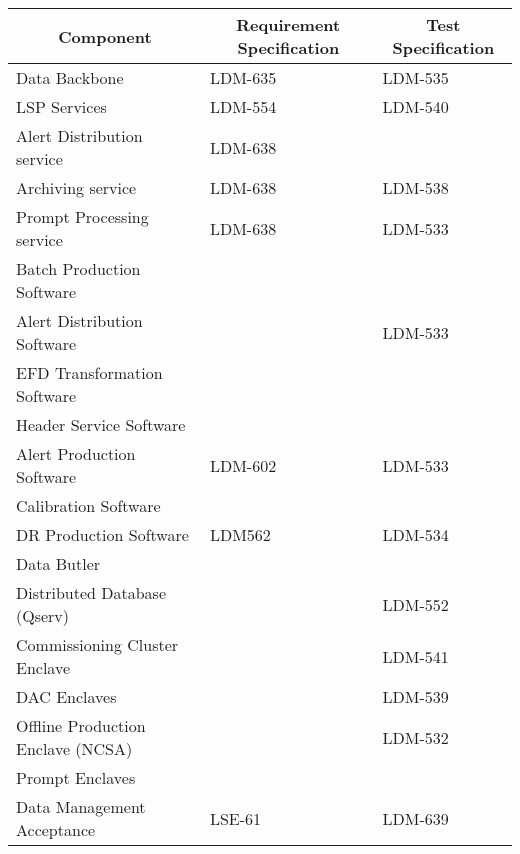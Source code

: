 \begin{longtable}{p{}|p{}|p{}}
\multicolumn{1}{c}{\textbf{Component}} & \multicolumn{1}{c}{\textbf{Requirement Specification}} &  \multicolumn{1}{c}{\textbf{Test Specification}} \\ \hline

Data Backbone                     & \cellcolor{dmorange} LDM-635 & \cellcolor{dmyellow} LDM-535 \\\hline
LSP Services                      &   \cellcolor{dmblue} LDM-554 &   \cellcolor{dmblue} LDM-540 \\\hline
Alert Distribution service        & \cellcolor{dmyellow} LDM-638 &                              \\\hline
Archiving service                 & \cellcolor{dmyellow} LDM-638 &   \cellcolor{dmblue} LDM-538 \\\hline
Prompt Processing service         & \cellcolor{dmyellow} LDM-638 &   \cellcolor{dmblue} LDM-533 \\\hline
Batch Production Software         &                              &                              \\\hline
Alert Distribution Software       &                              &   \cellcolor{dmblue} LDM-533 \\\hline
EFD Transformation Software       &                              &                              \\\hline
Header Service Software           &                              &                              \\\hline
Alert Production Software         &   \cellcolor{dmblue} LDM-602 &   \cellcolor{dmblue} LDM-533 \\\hline
Calibration Software              &                              &                              \\\hline
DR Production Software            &    \cellcolor{dmblue} LDM562 &   \cellcolor{dmblue} LDM-534 \\\hline
Data Butler                       &                              &                              \\\hline
Distributed Database (Qserv)      &                              &   \cellcolor{dmblue} LDM-552 \\\hline
Commissioning Cluster Enclave     &                              & \cellcolor{dmyellow} LDM-541 \\\hline
DAC Enclaves                      &                              & \cellcolor{dmyellow} LDM-539 \\\hline
Offline Production Enclave (NCSA) &                              & \cellcolor{dmyellow} LDM-532 \\\hline
Prompt Enclaves                   &                              &                              \\\hline
Data Management Acceptance        &    \cellcolor{dmblue} LSE-61 & \cellcolor{dmorange} LDM-639 \\\hline


\end{longtable}
